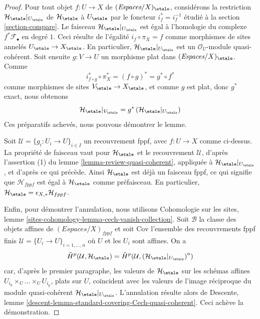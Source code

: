 \begin{proof}
Pour tout objet $f : U \to X$ de $(\textit{Espaces}/X)_\etale$, considérons la
restriction $\mathcal{H}_\etale|_{U_\etale}$ de $\mathcal{H}_\etale$ à
$U_\etale$ par le foncteur $i_f^* = i_f^{-1}$ étudié à la section
\ref{section-compare}. Le faisceau $\mathcal{H}_\etale|_{U_\etale}$ est égal à
l'homologie du complexe $f^*\mathcal{F}_\bullet$ en degré $1$.
Ceci résulte de l'égalité $i_f \circ \pi_X = f$ comme morphismes de sites
annelés $U_\etale \to X_\etale$. En particulier,
$\mathcal{H}_\etale|_{U_\etale}$ est un $\mathcal{O}_U$-module quasi-cohérent.
Soit ensuite $g : V \to U$ un morphisme plat dans
$(\textit{Espaces}/X)_\etale$. Comme
$$
i_{f \circ g}^* \circ \pi_X^* = (f \circ g)^* = g^* \circ f^*
$$
comme morphismes de sites $V_\etale \to X_\etale$, et comme $g$ est plat, donc
$g^*$ exact, nous obtenons
$$
\mathcal{H}_\etale|_{V_\etale} =
g^*\left(\mathcal{H}_\etale|_{U_\etale}\right)
$$
Ces préparatifs achevés, nous pouvons démontrer le lemme.

\medskip\noindent
Soit $\mathcal{U} = \{g_i : U_i \to U\}_{i \in I}$ un recouvrement fppf, avec
$f : U \to X$ comme ci-dessus. La propriété de faisceau vaut pour
$\mathcal{H}_\etale$ et le recouvrement $\mathcal{U}$, d'après l'assertion (1)
du lemme \ref{lemma-review-quasi-coherent}, appliquée à
$\mathcal{H}_\etale|_{U_\etale}$, et d'après ce qui précède.
Ainsi $\mathcal{H}_\etale$ est déjà un faisceau fppf, ce qui signifie que
$\mathcal{H}_{fppf}$ est égal à $\mathcal{H}_\etale$ comme préfaisceau.
En particulier,
$\mathcal{H}_\etale = \epsilon_{X, *}\mathcal{H}_{fppf}$.

\medskip\noindent
Enfin, pour démontrer l'annulation, nous utilisons Cohomologie sur les sites,
lemme \ref{sites-cohomology-lemma-cech-vanish-collection}. Soit $\mathcal{B}$
la classe des objets affines de $(\textit{Espaces}/X)_{fppf}$ et soit
$\text{Cov}$ l'ensemble des recouvrements fppf finis
$\mathcal{U} = \{U_i \to U\}_{i = 1, \ldots, n}$ où $U$ et les $U_i$ sont affines.
On a
$$
{\check H}^p(\mathcal{U}, \mathcal{H}_\etale) =
{\check H}^p(\mathcal{U}, \left(\mathcal{H}_\etale|_{U_\etale}\right)^a)
$$
car, d'après le premier paragraphe, les valeurs de $\mathcal{H}_\etale$ sur les
schémas affines $U_{i_0} \times_U \ldots \times_U U_{i_p}$, plats sur $U$,
coïncident avec les valeurs de l'image réciproque du module quasi-cohérent
$\mathcal{H}_\etale|_{U_\etale}$. L'annulation résulte alors de Descente, lemme
\ref{descent-lemma-standard-covering-Cech-quasi-coherent}.
Ceci achève la démonstration.
\end{proof}

